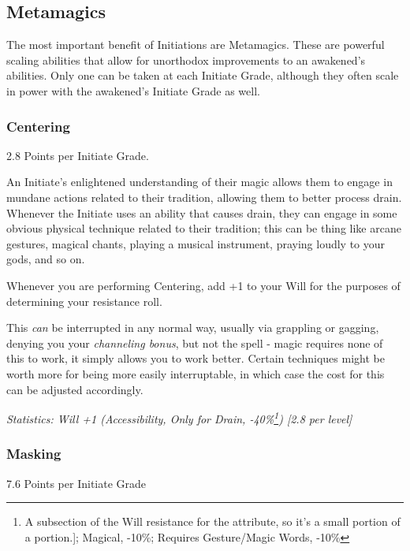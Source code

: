 \begin{multicols*}{3}
	\subsection{Metamagics}
	
	The most important benefit of Initiations are Metamagics. These are powerful scaling abilities that allow for unorthodox improvements to an awakened's abilities. Only one can be taken at each Initiate Grade, although they often scale in power with the awakened's Initiate Grade as well.
	
	\subsubsection{Centering}
	\begin{flushright}
		2.8 Points per Initiate Grade.
	\end{flushright}
	
	An Initiate's enlightened understanding of their magic allows them to engage in mundane actions related to their tradition, allowing them to better process drain. Whenever the Initiate uses an ability that causes drain, they can engage in some obvious physical technique related to their tradition; this can be thing like arcane gestures, magical chants, playing a musical instrument,  praying loudly to your gods, and so on. 
	
	Whenever you are performing Centering, add +1 to your Will for the purposes of determining your resistance roll.
	
	This \textit{can} be interrupted in any normal way, usually via grappling or gagging, denying you your \textit{channeling bonus}, but not the spell - magic requires none of this to work, it simply allows you to work better. Certain techniques might be worth more for being more easily interruptable, in which case the cost for this can be adjusted accordingly.
	
	\textcolor{OliveGreen}{\textit{Statistics: Will +1 (Accessibility, Only for Drain, -40\%\footnote{A subsection of the Will resistance for the attribute, so it's a small portion of a portion.]; Magical, -10\%; Requires Gesture/Magic Words, -10\%}) [2.8 per level] }}
	
	\subsubsection{Masking}
	\begin{flushright}
		7.6 Points per Initiate Grade
	\end{flushright}


\end{multicols*}
